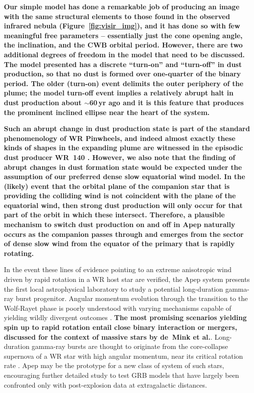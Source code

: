 \documentclass[preprint,times]{aastex61}
\begin{document}
\textbf{Our simple model has done a remarkable job of producing an image with the same structural elements to those found in the observed infrared nebula (Figure~\ref{fig:visir_img}), and it has done so with few meaningful free parameters -- essentially just the cone opening angle, the inclination, and the CWB orbital period. However, there are two additional degrees of freedom in the model that need to be discussed. The model presented has a discrete ``turn-on'' and ``turn-off'' in dust production, so that no dust is formed over one-quarter of the binary period. The older (turn-on) event delimits the outer periphery of the plume; the model turn-off event implies a relatively abrupt halt in dust production about $\sim$60\,yr ago and it is this feature that produces the prominent inclined ellipse near the heart of the system. }

\textbf{Such an abrupt change in dust production state is part of the standard phenomenology of WR Pinwheels, and indeed almost exactly these kinds of shapes in the expanding plume are witnessed in the episodic dust producer WR~140 \cite{Williams2009}. However, we also note that the finding of abrupt changes in dust formation state would be expected under the assumption of our preferred dense slow equatorial wind model. In the (likely) event that the orbital plane of the companion star that is providing the colliding wind is not coincident with the plane of the equatorial wind, then strong dust production will only occur for that part of the orbit in which these intersect. Therefore, a plausible mechanism to switch dust production on and off in Apep naturally occurs as the companion passes through and emerges from the sector of dense slow wind from the equator of the primary that is rapidly rotating.}

In the event these lines of evidence pointing to an extreme anisotropic wind driven by rapid rotation in a WR host star are verified, the Apep system presents the first local astrophysical laboratory to study a potential long-duration gamma-ray burst progenitor. Angular momentum evolution through the transition to the Wolf-Rayet phase is poorly understood with varying mechanisms capable of yielding wildly divergent outcomes \citep{2014A&A...562A.118S}. {\bf The most promising scenarios yielding spin up to rapid rotation entail close binary interaction or mergers, discussed for the context of massive stars by de~Mink et al.\citep{deMink2013}}. Long-duration gamma-ray bursts are thought to originate from the core-collapse supernova of a WR star with high angular momentum, near its critical rotation rate \citep{1993ApJ...405..273W,2012A&A...547A..83G}. Apep may be the prototype for a new class of system of such stars, encouraging further detailed study to test GRB models that have largely been confronted only with post-explosion data at extragalactic distances.
\end{document}
